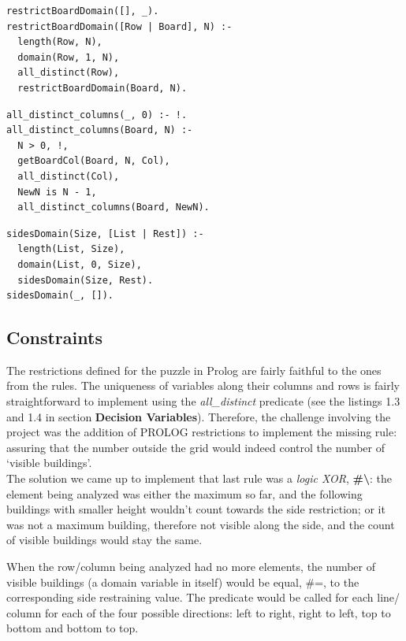 \documentclass{llncs}
\begin{document}
\noindent\begin{minipage}{.44\textwidth}
\begin{lstlisting}[frame= tblr, caption=Row domain restrictions]
restrictBoardDomain([], _).
restrictBoardDomain([Row | Board], N) :-
  length(Row, N),
  domain(Row, 1, N),
  all_distinct(Row),
  restrictBoardDomain(Board, N).
\end{lstlisting}
\end{minipage}\hfill
\begin{minipage}{.5\textwidth}
\begin{lstlisting}[frame=tblr, caption=Column all elements distinct]
all_distinct_columns(_, 0) :- !.
all_distinct_columns(Board, N) :-
  N > 0, !,
  getBoardCol(Board, N, Col),
  all_distinct(Col),
  NewN is N - 1,
  all_distinct_columns(Board, NewN).
\end{lstlisting}
\end{minipage}\hfill
\begin{lstlisting}[frame=tblr, caption=Constraints for the Border restrictions domains]
sidesDomain(Size, [List | Rest]) :-
  length(List, Size),
  domain(List, 0, Size),
  sidesDomain(Size, Rest).
sidesDomain(_, []).
\end{lstlisting}

%
\subsection{Constraints}

The restrictions defined for the puzzle in Prolog are fairly faithful to the ones from the rules. The uniqueness of variables along their columns and rows is fairly straightforward to implement using the \textit{all\_distinct} predicate (see the listings 1.3 and 1.4 in section \textbf{Decision Variables}). Therefore, the challenge involving the project was the addition of PROLOG restrictions to implement the missing rule: assuring that the number outside the grid would indeed control the number of `visible buildings'.\\

The solution we came up to implement that last rule was a \textit{logic XOR}, \textbf{\#\textbackslash}: the element being analyzed was either the maximum so far, and the following buildings with smaller height wouldn't count towards the side restriction; or it was not a maximum building, therefore not visible along the side, and the count of visible buildings would stay the same.

When the row/column being analyzed had no more elements, the number of visible buildings (a domain variable in itself) would be equal, \#=, to the corresponding side restraining value. The predicate would be called for each line/ column for each of the four possible directions: left to right, right to left, top to bottom and bottom to top.
\end{document}
